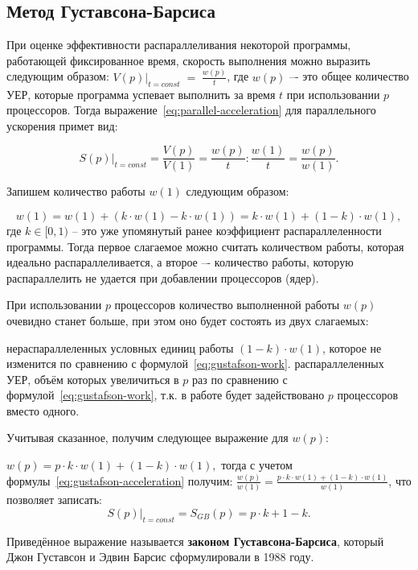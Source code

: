 \subsection{Метод Густавсона-Барсиса}
\label{subsec:gustafson-barsis-law}

При оценке эффективности распараллеливания некоторой программы, работающей фиксированное время, скорость выполнения можно выразить следующим образом: $\left.V(p)\right|_{t=const}\;=\;\frac {w(p)}t$, где $w(p)$ –- это общее количество УЕР, которые программа успевает выполнить за время $t$ при использовании $p$ процессоров. Тогда выражение~\eqref{eq:parallel-acceleration} для параллельного ускорения примет вид:

\begin{equation}
    \label{eq:gustafson-acceleration}
    \left.S(p)\right|_{t=const} = \frac{V(p)}{V(1)} = \frac{w(p)}{t} : \frac{w(1)}{t} = \frac{w(p)}{w(1)}.
\end{equation}

Запишем количество работы $w(1)$ следующим образом:

\begin{equation}
    \label{eq:gustafson-work}
    w(1) = w(1) + (k \cdot w(1) - k \cdot w(1)) = k \cdot w(1) + (1 - k) \cdot w(1),
\end{equation}
где $k\in[0,1)$ -- это уже упомянутый ранее коэффициент распараллеленности программы. Тогда первое слагаемое можно считать количеством работы, которая идеально распараллеливается, а второе –- количество работы, которую распараллелить не удается при добавлении процессоров (ядер).

При использовании $p$ процессоров количество выполненной работы $w(p)$ очевидно станет больше, при этом оно  будет состоять из двух слагаемых: 

\begin{itemize}
     нераспараллеленных условных единиц работы $(1-k) \cdot w(1)$, которое не изменится по сравнению с формулой~\eqref{eq:gustafson-work}.
     распараллеленных УЕР, объём которых увеличиться в $p$ раз по сравнению с формулой~\eqref{eq:gustafson-work}, т.к. в работе будет задействовано $p$ процессоров вместо одного.
\end{itemize}

Учитывая сказанное, получим следующее выражение для $w(p)$:

$w(p) = p \cdot k \cdot w(1) + (1 - k) \cdot w(1),$ тогда с учетом формулы~\eqref{eq:gustafson-acceleration} получим: $\frac{w(p)}{w(1)} = \frac{p \cdot k \cdot w(1) + (1 - k) \cdot w(1)}{w(1)}$, что позволяет записать:
\begin{equation}
    \left.S(p)\right|_{t=const} = S_{GB}(p) = p \cdot k + 1 - k.
\end{equation}

Приведённое выражение называется \textbf{законом Густавсона-Барсиса}, который Джон Густавсон и Эдвин Барсис сформулировали в 1988 году. 
